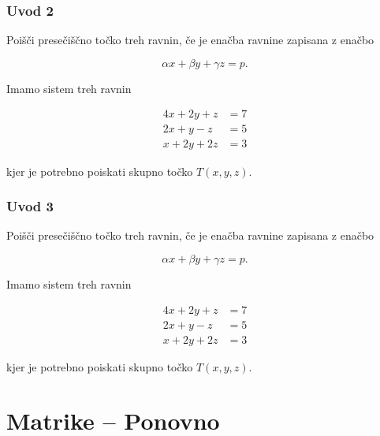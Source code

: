 \documentclass[8pt,aspectratio=169]{beamer} %
\begin{document}

\begin{frame}
	\frametitle{Uvod 2}
	
	 Poišči presečiščno točko treh ravnin, če je enačba ravnine zapisana z enačbo
	
	\[
	\alpha x + \beta y + \gamma z = p.
	\]
	
	 Imamo sistem treh ravnin
	
	\begin{equation} \label{eq:plane_system}
		\begin{split}
			4 x + 2 y + z & = 7\\
			2 x + y - z & = 5\\
			x + 2 y + 2 z & = 3
		\end{split}	
	\end{equation}
	
	kjer je potrebno poiskati skupno točko $T(x,y,z)$.
\end{frame}


\begin{frame}
	\frametitle{Uvod 3}
	
	 Poišči presečiščno točko treh ravnin, če je enačba ravnine zapisana z enačbo
	
	\[
	\alpha x + \beta y + \gamma z = p.
	\]
	
	 Imamo sistem treh ravnin
	
	\begin{equation} \label{eq:plane_system}
		\begin{split}
			4 x + 2 y + z & = 7\\
			2 x + y - z & = 5\\
			x + 2 y + 2 z & = 3
		\end{split}	
	\end{equation}
	
	kjer je potrebno poiskati skupno točko $T(x,y,z)$.
\end{frame}



\section{Matrike -- Ponovno}

\begin{frame}[plain,noframenumbering,label=newsection]
	\vfill
	\begin{center}
		
		\vspace*{5mm}
		\textcolor{royalblue1}{\textbf{\insertsectionhead}}
	\end{center}
	\vfill
\end{frame}
\end{document}

